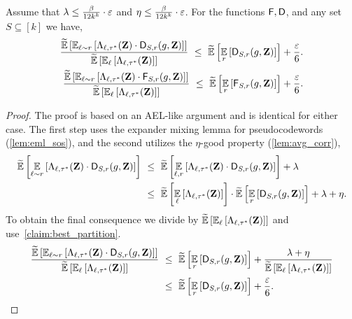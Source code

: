 \begin{lemma}\label{lemma:local_erasures_upper_bound} 
Assume that $\lambda \leq \frac{\beta}{12k^{k}}\cdot \varepsilon$ and $\eta \leq \frac{\beta}{12k^{k}}\cdot \varepsilon$.
For the functions ${ \mathsf{F} }, { \mathsf{D} }$, and any set $S\subseteq [k]$ we have,
\begin{align*}
	\frac{\tildeEx{\Ex{\li \sim \ri}{\Lambda_{\li,\tau^*}(\zee) \cdot \dd_{S,\ri}(g,\zee)}}}{\tildeEx{\Ex{\li}{\Lambda_{\li,\tau^*}(\zee)}}} ~\leq~ \tildeEx{\Ex{\ri}{\dd_{S,\ri}(g,\zee)}} + \frac{\eps}{6}.\\
		\frac{\tildeEx{\Ex{\li \sim \ri}{\Lambda_{\li,\tau^*}(\zee) \cdot \fd_{S,\ri}(g,\zee)}}}{\tildeEx{\Ex{\li}{\Lambda_{\li,\tau^*}(\zee)}}} ~\leq~ \tildeEx{\Ex{\ri}{\fd_{S,\ri}(g,\zee)}} + \frac{\eps}{6}.
		\end{align*}
	\end{lemma}
\begin{proof} The proof is based on an AEL-like argument and is identical for either case. The first step uses the expander mixing lemma for pseudocodewords (\cref{lem:eml_sos}), and the second utilizes the $\eta$-good property (\cref{lem:avg_corr}),
	\begin{align*}
		\tildeEx{\Ex{\li\sim \ri}{\Lambda_{\li,\tau^*}(\zee) \cdot \dd_{S,\ri}(g,\zee)}}	~&\leq~ \tildeEx{\Ex{\li , \ri}{\Lambda_{\li,\tau^*}(\zee) \cdot \dd_{S,\ri}(g,\zee)}} + \lambda \\
		~&\leq~ \tildeEx{\Ex{\li}{\Lambda_{\li,\tau^*}(\zee)}} \cdot \tildeEx{\Ex{\ri}{\dd_{S,\ri}(g,\zee)}} + \lambda + \eta.
	\end{align*}
	To obtain the final consequence we divide by $\tildeEx{\Ex{\li}{\Lambda_{\li,\tau^*}(\zee)}}$ and use~\cref{claim:best_partition}.
		\begin{align*}
		\frac{\tildeEx{\Ex{\li\sim \ri}{\Lambda_{\li,\tau^*}(\zee) \cdot \dd_{S,\ri}(g,\zee)}}}{\tildeEx{\Ex{\li}{\Lambda_{\li,\tau^*}(\zee)}}} ~&\leq~ \tildeEx{\Ex{\ri}{\dd_{S,\ri}(g,\zee)}} + \frac{\lambda + \eta}{\tildeEx{\Ex{\li}{\Lambda_{\li,\tau^*}(\zee)}}} \\
		~&\leq~  \tildeEx{\Ex{\ri}{\dd_{S,\ri}(g,\zee)}} + \frac{\eps}{6}. \qedhere
	\end{align*}
\end{proof}

